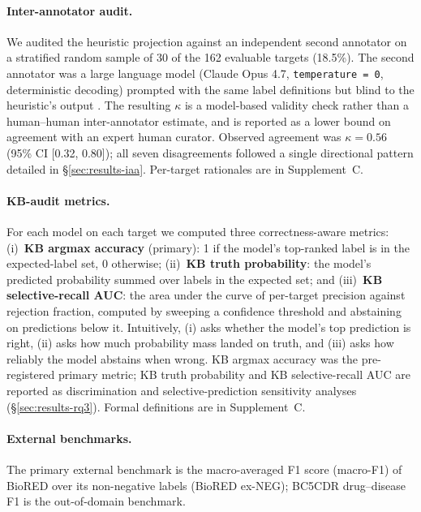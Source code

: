 \paragraph{Inter-annotator audit.}
We audited the heuristic projection against an independent second
annotator on a stratified random sample of 30 of the 162 evaluable
targets (18.5\%). The second annotator was a large language model
(Claude Opus 4.7, \texttt{temperature\,=\,0}, deterministic
decoding) prompted with the same label definitions but blind to the
heuristic's output \citep{gilardi2023llmannotator}. The resulting
$\kappa$ is a model-based validity check rather than a
human--human inter-annotator estimate, and is reported as a lower
bound on agreement with an expert human curator. Observed agreement
was \(\kappa = 0.56\) (95\% CI [0.32, 0.80]); all seven
disagreements followed a single directional pattern detailed in
\S\ref{sec:results-iaa}. Per-target rationales are in Supplement~C.

\paragraph{KB-audit metrics.}
For each model on each target we computed three correctness-aware
metrics: (i)~\textbf{KB argmax accuracy} (primary): 1 if the
model's top-ranked label is in the expected-label set, 0 otherwise;
(ii)~\textbf{KB truth probability}: the model's predicted
probability summed over labels in the expected set; and
(iii)~\textbf{KB selective-recall AUC}: the area under the curve of
per-target precision against rejection fraction, computed by
sweeping a confidence threshold and abstaining on predictions below
it. Intuitively, (i) asks whether the model's top prediction is
right, (ii) asks how much probability mass landed on truth, and
(iii) asks how reliably the model abstains when wrong. KB argmax
accuracy was the pre-registered primary metric; KB truth probability
and KB selective-recall AUC are reported as discrimination and
selective-prediction sensitivity analyses (\S\ref{sec:results-rq3}).
Formal definitions are in Supplement~C.

\paragraph{External benchmarks.}
The primary external benchmark is the macro-averaged F1 score
(macro-F1) of BioRED over its non-negative labels (BioRED ex-NEG);
BC5CDR drug--disease F1 is the out-of-domain benchmark.

